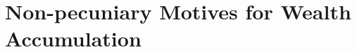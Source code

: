 \documentclass[11pt]{article}
\begin{document}
\section{Non-pecuniary Motives for Wealth Accumulation} 
\end{document}

